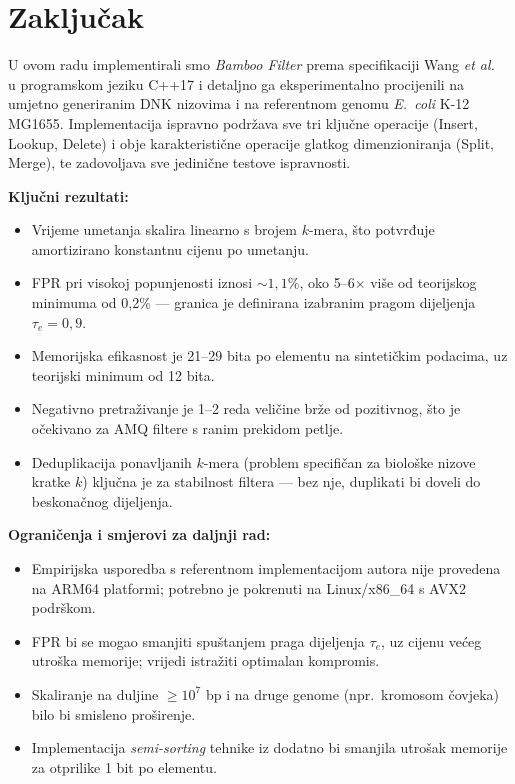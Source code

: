 \documentclass[12pt,a4paper]{article}
\begin{document}
\section{Zaključak}
\label{sec:zakljucak}

U ovom radu implementirali smo \emph{Bamboo Filter} prema specifikaciji Wang
\textit{et al.}~\cite{wang2022bamboo, wang2024bamboo} u programskom jeziku C++17 i
detaljno ga eksperimentalno procijenili na umjetno generiranim DNK nizovima i na
referentnom genomu \textit{E.~coli} K-12 MG1655. Implementacija ispravno podržava sve
tri ključne operacije (Insert, Lookup, Delete) i obje karakteristične operacije
glatkog dimenzioniranja (Split, Merge), te zadovoljava sve jedinične testove
ispravnosti.

\noindent\textbf{Ključni rezultati:}
\begin{itemize}
    \item Vrijeme umetanja skalira linearno s brojem $k$-mera, što potvrđuje
          amortizirano konstantnu cijenu po umetanju.
    \item FPR pri visokoj popunjenosti iznosi $\sim 1{,}1\%$, oko 5--6$\times$ više od
          teorijskog minimuma od 0{,}2\% --- granica je definirana izabranim pragom
          dijeljenja $\tau_e = 0{,}9$.
    \item Memorijska efikasnost je 21--29 bita po elementu na sintetičkim podacima,
          uz teorijski minimum od 12 bita.
    \item Negativno pretraživanje je 1--2 reda veličine brže od pozitivnog, što je
          očekivano za AMQ filtere s ranim prekidom petlje.
    \item Deduplikacija ponavljanih $k$-mera (problem specifičan za biološke nizove
          kratke $k$) ključna je za stabilnost filtera --- bez nje, duplikati bi doveli
          do beskonačnog dijeljenja.
\end{itemize}

\noindent\textbf{Ograničenja i smjerovi za daljnji rad:}
\begin{itemize}
    \item Empirijska usporedba s referentnom implementacijom autora nije provedena na
          ARM64 platformi; potrebno je pokrenuti na Linux/x86\_64 s AVX2 podrškom.
    \item FPR bi se mogao smanjiti spuštanjem praga dijeljenja $\tau_e$, uz cijenu
          većeg utroška memorije; vrijedi istražiti optimalan kompromis.
    \item Skaliranje na duljine $\geq 10^7$ bp i na druge genome (npr.~kromosom
          čovjeka) bilo bi smisleno proširenje.
    \item Implementacija \emph{semi-sorting} tehnike iz \cite{fan2014cuckoo} dodatno bi
          smanjila utrošak memorije za otprilike 1 bit po elementu.
\end{itemize}
\end{document}
